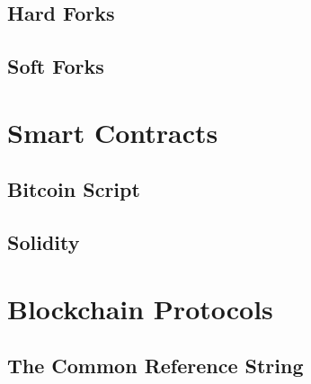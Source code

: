 \subsection{Hard Forks}
\subsection{Soft Forks}

\section{Smart Contracts}
\subsection{Bitcoin Script}
\subsection{Solidity}
\fi

\section{Blockchain Protocols}



\ifdraft
\subsection{The Common Reference String}
\fi


